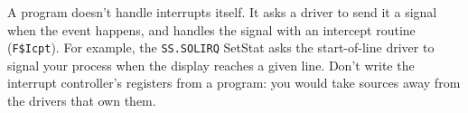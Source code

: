 A program doesn't handle interrupts itself. It asks a driver to send it a signal when the event happens, and handles the signal with an intercept routine (\verb+F$Icpt+). For example, the \verb+SS.SOLIRQ+ SetStat asks the start-of-line driver to signal your process when the display reaches a given line. Don't write the interrupt controller's registers from a program: you would take sources away from the drivers that own them.
